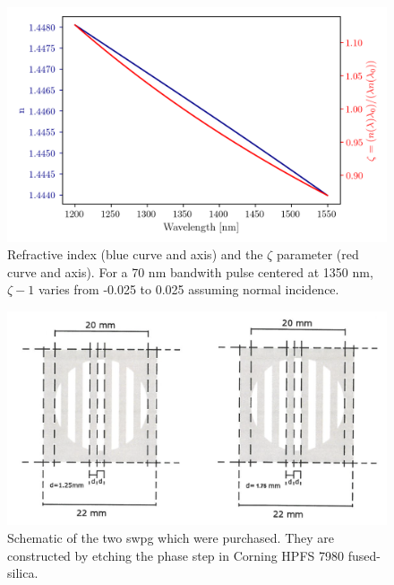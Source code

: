\begin{figure}
	\centering
	\includegraphics[width=1.0\textwidth]{figures/Two_source/n_zeta.png}
	\caption{Refractive index (blue curve and axis) and the $\zeta$ parameter (red curve and axis).  For a 70 nm bandwith pulse centered at 1350 nm, $\zeta - 1$ varies from -0.025 to 0.025 assuming normal incidence.}
	\label{fig:n_zeta}
\end{figure}

\begin{figure}
	\centering
	\includegraphics[width=1.0\textwidth]{figures/Two_source/silios_sketch.png}
	\caption{Schematic of the two \gls{swpg} which were purchased.  They are constructed by etching the phase step in Corning HPFS 7980 fused-silica.}
	\label{fig:silios_sketch}
\end{figure}

